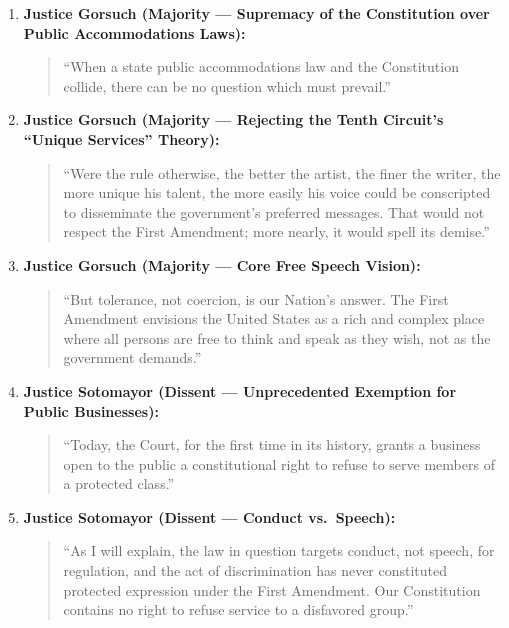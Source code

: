 \documentclass[12pt]{article}
\begin{document}
\begin{enumerate}
  \item \textbf{Justice Gorsuch (Majority --- Supremacy of the Constitution over Public Accommodations Laws):}
  \begin{quote}
    ``When a state public accommodations law and the Constitution collide, there can be no question which must prevail.''
  \end{quote}

  \item \textbf{Justice Gorsuch (Majority --- Rejecting the Tenth Circuit's ``Unique Services'' Theory):}
  \begin{quote}
    ``Were the rule otherwise, the better the artist, the finer the writer, the more unique his talent, the more easily his voice could be conscripted to disseminate the government's preferred messages. That would not respect the First Amendment; more nearly, it would spell its demise.''
  \end{quote}

  \item \textbf{Justice Gorsuch (Majority --- Core Free Speech Vision):}
  \begin{quote}
    ``But tolerance, not coercion, is our Nation's answer. The First Amendment envisions the United States as a rich and complex place where all persons are free to think and speak as they wish, not as the government demands.''
  \end{quote}

  \item \textbf{Justice Sotomayor (Dissent --- Unprecedented Exemption for Public Businesses):}
  \begin{quote}
    ``Today, the Court, for the first time in its history, grants a business open to the public a constitutional right to refuse to serve members of a protected class.''
  \end{quote}

  \item \textbf{Justice Sotomayor (Dissent --- Conduct vs.\ Speech):}
  \begin{quote}
    ``As I will explain, the law in question targets conduct, not speech, for regulation, and the act of discrimination has never constituted protected expression under the First Amendment. Our Constitution contains no right to refuse service to a disfavored group.''
  \end{quote}
\end{enumerate}
\end{document}
